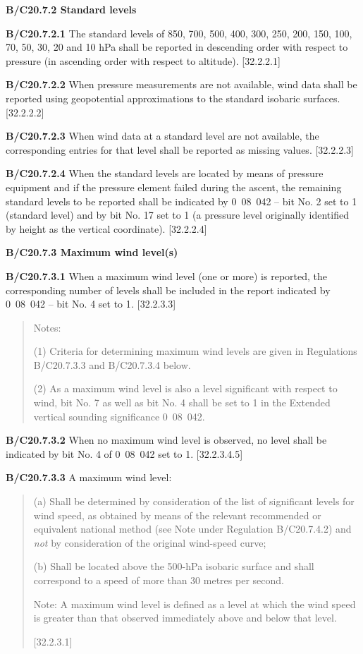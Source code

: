 \textbf{B/C20.7.2 Standard levels}

\textbf{B/C20.7.2.1} The standard levels of 850, 700, 500, 400, 300, 250, 200, 150, 100, 70, 50, 30, 20 and 10 hPa shall be reported in descending order with respect to pressure (in ascending order with respect to altitude). {[}32.2.2.1{]}

\textbf{B/C20.7.2.2} When pressure measurements are not available, wind data shall be reported using geopotential approximations to the standard isobaric surfaces. {[}32.2.2.2{]}

\textbf{B/C20.7.2.3} When wind data at a standard level are not available, the corresponding entries for that level shall be reported as missing values. {[}32.2.2.3{]}

\textbf{B/C20.7.2.4} When the standard levels are located by means of pressure equipment and if the pressure element failed during the ascent, the remaining standard levels to be reported shall be indicated by 0~08~042 -- bit No. 2 set to 1 (standard level) and by bit No. 17 set to 1 (a pressure level originally identified by height as the vertical coordinate). {[}32.2.2.4{]}

\textbf{B/C20.7.3 Maximum wind level(s)}

\textbf{B/C20.7.3.1} When a maximum wind level (one or more) is reported, the corresponding number of levels shall be included in the report indicated by 0~08~042 -- bit No. 4 set to 1\emph{.} {[}32.2.3.3{]}

\begin{quote}
Notes:

(1) Criteria for determining maximum wind levels are given in Regulations B/C20.7.3.3 and B/C20.7.3.4 below.

(2) As a maximum wind level is also a level significant with respect to wind, bit No. 7 as well as bit No. 4 shall be set to 1 in the Extended vertical sounding significance 0~08~042.
\end{quote}

\textbf{B/C20.7.3.2} When no maximum wind level is observed, no level shall be indicated by bit No. 4 of 0~08~042 set to 1. {[}32.2.3.4.5{]}

\textbf{B/C20.7.3.3} A maximum wind level:

\begin{quote}
(a) Shall be determined by consideration of the list of significant levels for wind speed, as obtained by means of the relevant recommended or equivalent national method (see Note under Regulation B/C20.7.4.2) and \emph{not} by consideration of the original wind-speed curve;

(b) Shall be located above the 500-hPa isobaric surface and shall correspond to a speed of more than 30 metres per second.

Note: A maximum wind level is defined as a level at which the wind speed is greater than that observed immediately above and below that level.

{[}32.2.3.1{]}
\end{quote}


